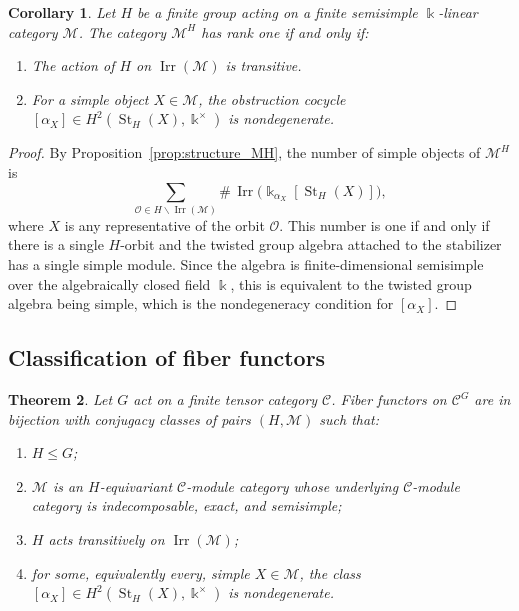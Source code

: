 \documentclass[12pt]{amsart}
\theoremstyle{plain}
\newtheorem{theorem}{Theorem}[section]
\newtheorem{corollary}[theorem]{Corollary}
\theoremstyle{definition} %
\theoremstyle{remark} %
\newcommand{\ku}{{\Bbbk}} %
\newcommand{\cC}{\mathcal{C}}
\newcommand{\cM}{\mathcal{M}}
\newcommand{\Irr}{\operatorname{Irr}}
\newcommand{\St}{\operatorname{St}}
\begin{document}
\begin{corollary}\label{cor:rank_one_MH}
Let $H$ be a finite group acting on a finite semisimple $\ku$-linear category $\cM$. The category $\cM^H$ has rank one if and only if:
\begin{enumerate}
    \item The action of $H$ on $\Irr(\cM)$ is transitive.
    \item For a simple object $X \in \cM$, the obstruction cocycle $[\alpha_X] \in H^2(\St_H(X), \ku^\times)$ is nondegenerate.
\end{enumerate}
\end{corollary}

\begin{proof}
By Proposition~\ref{prop:structure_MH}, the number of simple objects of $\cM^H$ is
\[
\sum_{\mathcal{O}\in H\backslash \Irr(\cM)}
\#\,\Irr\big(\ku_{\alpha_X}[\St_H(X)]\big),
\]
where $X$ is any representative of the orbit $\mathcal{O}$. This number is one if and only if there is a single $H$-orbit and the twisted group algebra attached to the stabilizer has a single simple module. Since the algebra is finite-dimensional semisimple over the algebraically closed field $\ku$, this is equivalent to the twisted group algebra being simple, which is the nondegeneracy condition for $[\alpha_X]$.
\end{proof}

\subsection{Classification of fiber functors}

\begin{theorem}\label{thm:main_classification}
Let $G$ act on a finite tensor category $\cC$. Fiber functors on $\cC^G$ are in bijection with conjugacy classes of pairs $(H,\cM)$ such that:
\begin{enumerate}
\item $H\leq G$;
\item $\cM$ is an $H$-equivariant $\cC$-module category whose underlying $\cC$-module category is indecomposable, exact, and semisimple;
\item $H$ acts transitively on $\Irr(\cM)$;
\item for some, equivalently every, simple $X\in\cM$, the class $[\alpha_X]\in H^2(\St_H(X),\ku^\times)$ is nondegenerate.
\end{enumerate}
\end{theorem}
\end{document}
